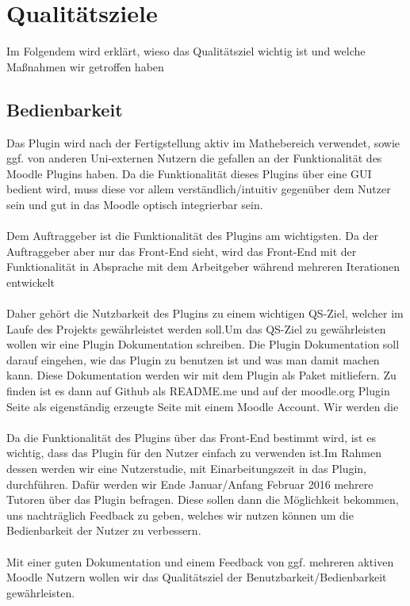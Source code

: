\documentclass[accentcolor=tud0b,12pt,paper=a4]{tudreport}
\begin{document}
	
	\chapter{Qualitätsziele}
	
	Im Folgendem wird erklärt, wieso das Qualitätsziel wichtig ist und welche Maßnahmen wir getroffen haben\\

        \section{Bedienbarkeit}
Das Plugin wird nach der Fertigstellung aktiv im Mathebereich verwendet, sowie ggf. von anderen Uni-externen Nutzern die gefallen an der Funktionalität des Moodle Plugins haben. Da die Funktionalität dieses Plugins über eine GUI bedient wird, muss diese vor allem verständlich/intuitiv gegenüber dem Nutzer sein und gut in das Moodle optisch integrierbar sein. 
\\
\\
Dem Auftraggeber ist die Funktionalität des Plugins am wichtigsten. Da der Auftraggeber aber nur das Front-End sieht, wird das Front-End mit der Funktionalität in Absprache mit dem Arbeitgeber während mehreren Iterationen entwickelt
\\
\\
Daher gehört die Nutzbarkeit des Plugins zu einem wichtigen QS-Ziel, welcher im Laufe des Projekts gewährleistet werden soll.Um das QS-Ziel zu gewährleisten wollen wir eine Plugin Dokumentation schreiben. Die Plugin Dokumentation soll darauf eingehen, wie  das Plugin zu benutzen ist und was man damit machen kann. Diese Dokumentation werden wir mit dem Plugin als Paket mitliefern. Zu finden ist es dann auf Github als README.me und auf der moodle.org Plugin Seite als eigenständig erzeugte Seite mit einem Moodle Account.
Wir werden die
\\
\\
Da die Funktionalität des Plugins über das Front-End bestimmt wird, ist es wichtig, dass das Plugin für den Nutzer einfach zu verwenden ist.Im Rahmen dessen werden wir eine Nutzerstudie, mit Einarbeitungszeit in das Plugin, durchführen. Dafür werden wir Ende Januar/Anfang Februar 2016 mehrere Tutoren über das Plugin befragen. Diese sollen dann die Möglichkeit bekommen, uns nachträglich Feedback zu geben, welches wir nutzen können um die Bedienbarkeit der Nutzer zu verbessern. 
\\
\\
Mit einer guten Dokumentation und einem Feedback von ggf. mehreren aktiven Moodle Nutzern wollen wir das Qualitätsziel der Benutzbarkeit/Bedienbarkeit gewährleisten.\\
\pagebreak
\end{document}
